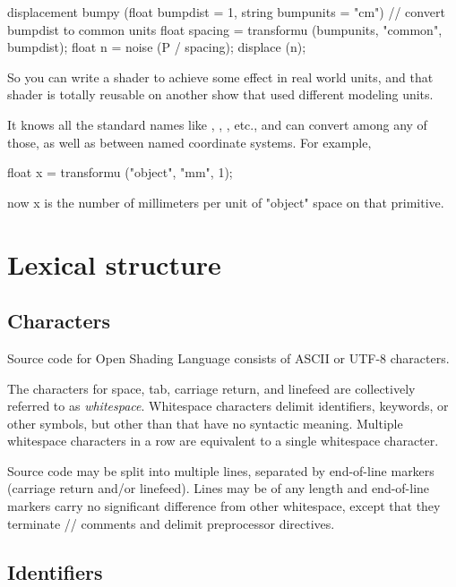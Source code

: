 \documentclass[11pt,letterpaper]{book}
\def\langname{Open Shading Language\xspace}
\def\objectspace{{\cf "object"} space\xspace}
\begin{document}
\begin{code}
    displacement bumpy (float bumpdist = 1,
                        string bumpunits = "cm")
    {
        // convert bumpdist to common units
        float spacing = transformu (bumpunits, "common", bumpdist);
        float n = noise (P / spacing);
        displace (n);
    }
\end{code}

So you can write a shader to achieve some effect in real world units,
and that shader is totally reusable on another show that used different
modeling units.

It knows all the standard names like , , ,
etc., and can convert among any of those, as well as between named
coordinate systems.  For example,

\begin{code}
    float x = transformu ("object", "mm", 1);
\end{code}

now {\cf x} is the number of millimeters per unit of \objectspace on
that primitive.


\chapter{Lexical structure}
\label{chap:lexical}

\section{Characters}
\label{sec:lexical:chars}

Source code for \langname consists of ASCII or UTF-8 characters.

The characters for space, tab, carriage return, and linefeed are
collectively referred to as \emph{whitespace}.  Whitespace characters
delimit identifiers, keywords, or other symbols, but other than that
have no syntactic meaning.  Multiple whitespace characters in a row
are equivalent to a single whitespace character. 

Source code may be split into multiple lines, separated by end-of-line
markers (carriage return and/or linefeed).  Lines may be of any length
and end-of-line markers carry no significant difference from other 
whitespace, except that they terminate {\cf //} comments and delimit
preprocessor directives.

\section{Identifiers}
\label{sec:identifiers}
\end{document}
